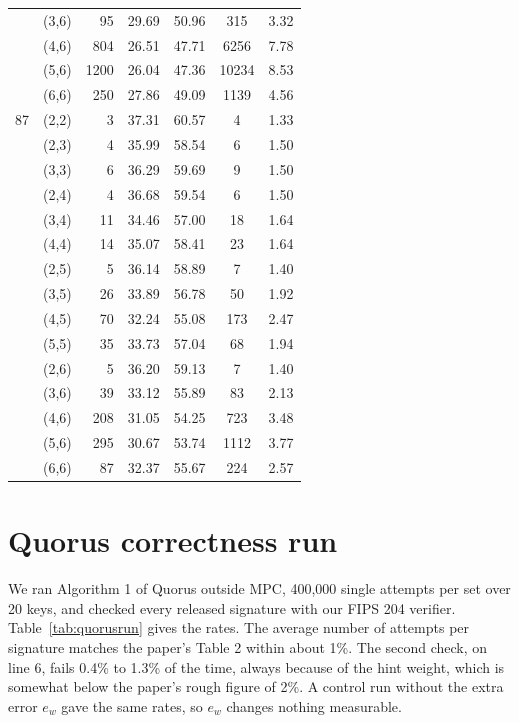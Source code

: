 \documentclass[10pt,conference,a4paper]{IEEEtran}
\begin{document}
\begin{table}[t]
\begin{tabular}{@{}llrcccc@{}}
 & (3,6) & 95 & 29.69 & 50.96 & 315 & 3.32\\
 & (4,6) & 804 & 26.51 & 47.71 & 6256 & 7.78\\
 & (5,6) & 1200 & 26.04 & 47.36 & 10234 & 8.53\\
 & (6,6) & 250 & 27.86 & 49.09 & 1139 & 4.56\\
\midrule
87 & (2,2) & 3 & 37.31 & 60.57 & 4 & 1.33\\
 & (2,3) & 4 & 35.99 & 58.54 & 6 & 1.50\\
 & (3,3) & 6 & 36.29 & 59.69 & 9 & 1.50\\
 & (2,4) & 4 & 36.68 & 59.54 & 6 & 1.50\\
 & (3,4) & 11 & 34.46 & 57.00 & 18 & 1.64\\
 & (4,4) & 14 & 35.07 & 58.41 & 23 & 1.64\\
 & (2,5) & 5 & 36.14 & 58.89 & 7 & 1.40\\
 & (3,5) & 26 & 33.89 & 56.78 & 50 & 1.92\\
 & (4,5) & 70 & 32.24 & 55.08 & 173 & 2.47\\
 & (5,5) & 35 & 33.73 & 57.04 & 68 & 1.94\\
 & (2,6) & 5 & 36.20 & 59.13 & 7 & 1.40\\
 & (3,6) & 39 & 33.12 & 55.89 & 83 & 2.13\\
 & (4,6) & 208 & 31.05 & 54.25 & 723 & 3.48\\
 & (5,6) & 295 & 30.67 & 53.74 & 1112 & 3.77\\
 & (6,6) & 87 & 32.37 & 55.67 & 224 & 2.57\\
\bottomrule
\end{tabular}
\end{table}

\section{Quorus correctness run}\label{app:quorus}
We ran Algorithm 1 of Quorus outside MPC, 400{,}000 single attempts per set over 20 keys, and checked every released
signature with our FIPS 204 verifier. Table~\ref{tab:quorusrun} gives the rates. The average number of attempts per
signature matches the paper's Table 2 within about 1\%. The second check, on line 6, fails 0.4\% to 1.3\% of the time,
always because of the hint weight, which is somewhat below the paper's rough figure of 2\%. A control run without the extra
error $e_w$ gave the same rates, so $e_w$ changes nothing measurable.
\end{document}
